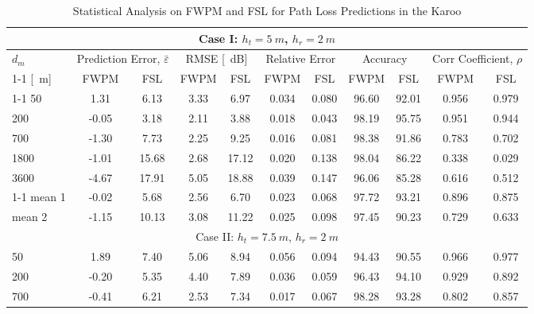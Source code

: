\documentclass[10pt,journal,twoside]{IEEEtran}
\renewcommand{\arraystretch}{1.3}
\begin{document}
\begin{table}[!ht]
	\centering
	\caption{Statistical Analysis on FWPM and FSL for Path Loss Predictions in the Karoo}
	\label{tb:stats2}
	\renewcommand{\arraystretch}{1.3}
	\setlength{\tabcolsep}{3pt}
	\begin{tabular*}{\linewidth}{ @{\extracolsep{\fill}} l*{10}c @{}}\toprule
		\multicolumn{11}{c}{Case I: $h_t = \SI{5}{m}$, $h_r = \SI{2}{m}$} \\    \midrule
		$d_m$& \multicolumn{2}{c}{Prediction Error, $\bar\varepsilon$} & \multicolumn{2}{c}{RMSE [\SI{}{dB}]} & \multicolumn{2}{c}{Relative Error} & \multicolumn{2}{c}{Accuracy} & \multicolumn{2}{c}{Corr Coefficient, $\rho$} \\ \cmidrule{1-1} \cmidrule{2-3} \cmidrule{4-5} \cmidrule{6-7} \cmidrule{8-9} \cmidrule{10-11}
		[\SI{}{m}]     & FWPM  & FSL   & FWPM  & FSL   & FWPM  & FSL   & FWPM  & FSL   & FWPM  & FSL \\
		\cmidrule{1-1} \cmidrule{2-3} \cmidrule{4-5} \cmidrule{6-7} \cmidrule{8-9} \cmidrule{10-11}
        50    & 1.31  & 6.13  & 3.33  & 6.97  & 0.034 & 0.080 & 96.60 & 92.01 & 0.956 & 0.979 \\
        200   & -0.05 & 3.18  & 2.11  & 3.88  & 0.018 & 0.043 & 98.19 & 95.75 & 0.951 & 0.944 \\
        700   & -1.30 & 7.73  & 2.25  & 9.25  & 0.016 & 0.081 & 98.38 & 91.86 & 0.783 & 0.702 \\
        1800  & -1.01 & 15.68 & 2.68  & 17.12 & 0.020 & 0.138 & 98.04 & 86.22 & 0.338 & 0.029 \\
        3600  & -4.67 & 17.91 & 5.05  & 18.88 & 0.039 & 0.147 & 96.06 & 85.28 & 0.616 & 0.512 \\ \cmidrule{1-1} \cmidrule{2-3} \cmidrule{4-5} \cmidrule{6-7} \cmidrule{8-9} \cmidrule{10-11}
        mean 1 & -0.02 & 5.68  & 2.56  & 6.70  & 0.023 & 0.068 & 97.72 & 93.21 & 0.896 & 0.875 \\
        mean 2 & -1.15 & 10.13 & 3.08  & 11.22 & 0.025 & 0.098 & 97.45 & 90.23 & 0.729 & 0.633 \\ \midrule
		\multicolumn{11}{c}{Case II: $h_t = \SI{7.5}{m}$, $h_r = \SI{2}{m}$} \\ \midrule
		50    & 1.89  & 7.40  & 5.06  & 8.94  & 0.056 & 0.094 & 94.43 & 90.55 & 0.966 & 0.977 \\
        200   & -0.20 & 5.35  & 4.40  & 7.89  & 0.036 & 0.059 & 96.43 & 94.10 & 0.929 & 0.892 \\
        700   & -0.41 & 6.21  & 2.53  & 7.34  & 0.017 & 0.067 & 98.28 & 93.28 & 0.802 & 0.857 \\

\end{tabular*}
\end{table}
\end{document}
